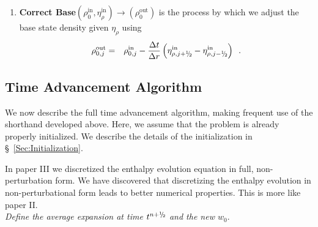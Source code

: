 \documentclass[11pt]{article}
\newcommand{\sfrac}[2]{\mathchoice
  {\kern0em\raise.5ex\hbox{\the\scriptfont0 #1}\kern-.15em/
   \kern-.15em\lower.25ex\hbox{\the\scriptfont0 #2}}
  {\kern0em\raise.5ex\hbox{\the\scriptfont0 #1}\kern-.15em/
   \kern-.15em\lower.25ex\hbox{\the\scriptfont0 #2}}
  {\kern0em\raise.5ex\hbox{\the\scriptscriptfont0 #1}\kern-.2em/
   \kern-.15em\lower.25ex\hbox{\the\scriptscriptfont0 #2}}
  {#1\!/#2}}
\newcommand{\myhalf}{\sfrac{1}{2}}
\newcommand{\nph}{{n + \myhalf}}
\newcommand{\inp}{\mathrm{in}}
\newcommand{\outp}{\mathrm{out}}
\newcommand{\dt}{\Delta t}
\newcommand{\dr}{\Delta r}
\newcommand{\etarho}{\eta_{\rho}}
\begin{document}
\begin{enumerate}
\item {\bf Correct Base}$(\rho_0^{\inp} , \etarho^{\inp}) \rightarrow (\rho_0^{\outp})$
is the process by which we adjust the base state density given $\etarho$ using
\begin{eqnarray}
\rho_{0,j}^{\outp} &=& \rho_{0,j}^{\inp} - \frac{\dt}{\dr} 
\left( \eta_{\rho,j+\myhalf}^{\inp} - \eta_{\rho,j-\myhalf}^{\inp}  \right)  \enskip . 
\end{eqnarray} 
\end{enumerate}

\subsection{Time Advancement Algorithm}

We now describe the full time advancement algorithm, making frequent
use of the shorthand developed above.  Here, we assume that the
problem is already properly initialized.  We describe the details of
the initialization in \S~\ref{Sec:Initialization}.

In paper III we discretized the enthalpy evolution equation in full, non-perturbation form.  
We have discovered that discretizing the enthalpy evolution in non-perturbational form 
leads to better numerical properties.  This is more like paper II.\\

 {\em Define the average expansion at time $t^\nph$ and the new $w_0.$}
\end{document}
